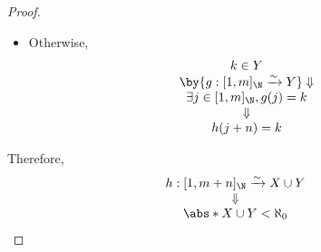 \begin{proof}
\begin{itemize}
\begin{itemize}
                  \[
                    \begin{array}{c}
                      k \in X                                                          \\
                      \by{\ensuremath{f: [1, n]_{\N} \xrightarrow{\sim} X}} \Downarrow \\
                      \exists i \in [1, n]_{\N}, f(i) = k                              \\
                      \Downarrow                                                       \\
                      h(i) = k
                    \end{array}
                  \]
            \item Otherwise,
                  \[
                    \begin{array}{c}
                      k \in Y                                                          \\
                      \by{\ensuremath{g: [1, m]_{\N} \xrightarrow{\sim} Y}} \Downarrow \\
                      \exists j \in [1, m]_{\N}, g(j) = k                              \\
                      \Downarrow                                                       \\
                      h(j + n) = k
                    \end{array}
                  \]
          \end{itemize}
  \end{itemize}
  Therefore,
  \[
    \begin{array}{c}
      h: [1, m + n]_{\N} \xrightarrow{\sim} X \cup Y \\
      \Downarrow                                     \\
      \abs*{X \cup Y} < \aleph_{0}
    \end{array}
  \]
\end{proof}
